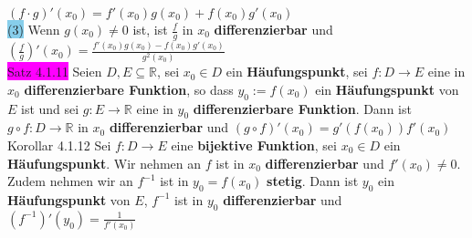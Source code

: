 \documentclass[landscape, 10pt]{article}
\newcommand{\R}{\mathbb{R}}
\begin{document}
\begin{multicols}{3}
{                            $(f\cdot g)'(x_0)=f'(x_0)g(x_0)+f(x_0)g'(x_0)$}\\
                     \colorbox{SkyBlue}{(3)} Wenn 
                            \textcolor{NavyBlue}{$g(x_0)\neq0$} ist, ist 
                            \textcolor{NavyBlue}{$\frac{f}{g}$} in 
                            \textcolor{NavyBlue}{$x_0$} \textbf{differenzierbar} und 
                            \textcolor{NavyBlue}{
                            $(\frac{f}{g})'(x_0)
                            =\frac{f'(x_0)g(x_0)-f(x_0)g'(x_0)}{g^2(x_0)}$} \\
              \colorbox{magenta}{Satz 4.1.11}
                     Seien \textcolor{NavyBlue}{$D,E\subseteq\R$}, 
                     sei \textcolor{NavyBlue}{$x_0\in D$}
                     ein \textbf{Häufungspunkt}, sei 
                     \textcolor{NavyBlue}{$f:D\longrightarrow E$}
                     eine in \textcolor{NavyBlue}{$x_0$}
                     \textbf{differenzierbare Funktion}, so dass 
                     \textcolor{NavyBlue}{$y_0:=f(x_0)$} ein 
                     \textbf{Häufungspunkt} von \textcolor{NavyBlue}{$E$} ist und 
                     sei \textcolor{NavyBlue}{$g:E\longrightarrow\R$} eine in 
                     \textcolor{NavyBlue}{$y_0$} 
                     \textbf{differenzierbare Funktion}. Dann ist 
                     \textcolor{NavyBlue}{$g\circ f:D\longrightarrow\R$} in 
                     \textcolor{NavyBlue}{$x_0$} \textbf{differenzierbar} und 
                     \textcolor{NavyBlue}{$(g\circ f)'(x_0)=g'(f(x_0))f'(x_0)$}\\
              \colorbox{BurntOrange}{Korollar 4.1.12}
                     Sei \textcolor{NavyBlue}{$f:D\longrightarrow E$} eine 
                     \textbf{bijektive Funktion}, sei 
                     \textcolor{NavyBlue}{$x_0\in D$} ein \textbf{Häufungspunkt}. 
                     Wir nehmen an \textcolor{NavyBlue}{$f$} ist 
                     in \textcolor{NavyBlue}{$x_0$} \textbf{differenzierbar} und 
                     \textcolor{NavyBlue}{$f'(x_0)\neq0$}. Zudem nehmen 
                     wir an \textcolor{NavyBlue}{$f^{-1}$} ist in \textcolor{NavyBlue}{$y_0=f(x_0)$}
                     \textbf{stetig}. Dann ist \textcolor{NavyBlue}{$y_0$} ein 
                     \textbf{Häufungspunkt} von \textcolor{NavyBlue}{$E$}, 
                     \textcolor{NavyBlue}{$f^{-1}$} ist in \textcolor{NavyBlue}{$y_0$} 
                     \textbf{differenzierbar} 
                     und \textcolor{NavyBlue}{
                     $(f^{-1})'(y_0)=\frac{1}{f'(x_0)}$}

\end{multicols}
\end{document}
